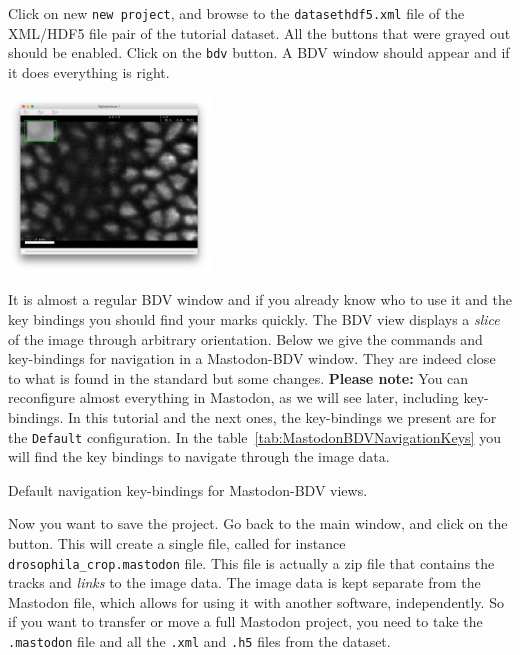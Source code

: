 Click on new \texttt{new project}, and browse to the \texttt{datasethdf5.xml} file of the XML/HDF5 file pair of the tutorial dataset.
All the buttons that were grayed out should be enabled. 
Click on the \texttt{bdv} button.
A BDV window should appear and if it does everything is right.
\begin{center}
         \includegraphics[width=0.4\textwidth]{figures/Mastodon_BDV.png}
\end{center}

It is almost a regular BDV window and if you already know who to use it and the key bindings you should find your marks quickly.
The BDV view displays a \textit{slice} of the image through arbitrary orientation. 
Below we give the commands and key-bindings for navigation in a Mastodon-BDV window. 
They are indeed close to what is found in the standard \Bdv but some changes. 
\textbf{Please note:} You can reconfigure almost everything in Mastodon, as we will see later, including key-bindings.
In this tutorial and the next ones, the key-bindings we present are for the \texttt{Default} configuration.
In the table~\ref{tab:MastodonBDVNavigationKeys} you will find the key bindings to navigate through the image data.

\begin{table}[!htbp]
    \centering
    
    \caption{Default navigation key-bindings for Mastodon-BDV views.}

    

    \label{tab:MastodonBDVNavigationKeys}
    \vspace{-10pt}

\end{table}

Now you want to save the project. 
Go back to the main window, and click on the  button.
This will create a single file, called for instance \texttt{drosophila\_crop.mastodon} file. 
This file is actually a zip file that contains the tracks and \textit{links} to the image data.
The image data is kept separate from the Mastodon file, which allows for using it with another software, independently. 
So if you want to transfer or move a full Mastodon project, you need to take the \texttt{.mastodon} file and all the \texttt{.xml} and \texttt{.h5} files from the \Bdv dataset.

